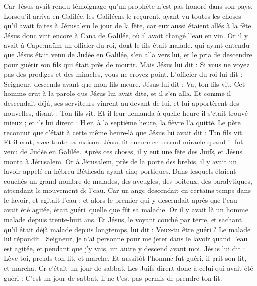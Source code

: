 \begin{multicols}{2}
Car Jésus avait rendu témoignage qu'un prophète n'est pas honoré dans son pays.
Lorsqu'il arriva en Galilée, les Galiléens le reçurent, ayant vu toutes les choses qu'il avait faites à Jérusalem le jour de la fête, car eux aussi étaient allés à la fête.
Jésus donc vint encore à Cana de Galilée, où il avait changé l'eau en vin. Or il y avait à Capernaüm un officier du roi, dont le fils était malade.
qui ayant entendu que Jésus était venu de Judée en Galilée, s'en alla vers lui, et le pria de descendre pour guérir son fils qui était près de mourir.
Mais Jésus lui dit : Si vous ne voyez pas des prodiges et des miracles, vous ne croyez point.
L'officier du roi lui dit : Seigneur, descends avant que mon fils meure.
Jésus lui dit : Va, ton fils vit. Cet homme crut à la parole que Jésus lui avait dite, et il s'en alla.
Et comme il descendait déjà, ses serviteurs vinrent au-devant de lui, et lui apportèrent des nouvelles, disant : Ton fils vit.
Et il leur demanda à quelle heure il s'était trouvé mieux ; et ils lui dirent : Hier, à la septième heure, la fièvre l'a quitté.
Le père reconnut que c'était à cette même heure-là que Jésus lui avait dit : Ton fils vit. Et il crut, avec toute sa maison.
Jésus fit encore ce second miracle quand il fut venu de Judée en Galilée.
\VerseOne{}Après ces choses, il y eut une fête des Juifs, et Jésus monta à Jérusalem.
Or à Jérusalem, près de la porte des brebis, il y avait un lavoir appelé en hébreu Béthesda ayant cinq portiques.
Dans lesquels étaient couchés un grand nombre de malades, des aveugles, des boiteux, des paralytiques, attendant le mouvement de l'eau.
Car un ange descendait en certains temps dans le lavoir, et agitait l'eau ; et alors le premier qui y descendait après que l'eau avait été agitée, était guéri, quelle que fût sa maladie.
Or il y avait là un homme malade depuis trente-huit ans.
Et Jésus, le voyant couché par terre, et sachant qu'il était déjà malade depuis longtemps, lui dit : Veux-tu être guéri ?
Le malade lui répondit : Seigneur, je n'ai personne pour me jeter dans le lavoir quand l'eau est agitée, et pendant que j'y vais, un autre y descend avant moi.
Jésus lui dit : Lève-toi, prends ton lit, et marche.
Et aussitôt l'homme fut guéri, il prit son lit, et marcha. Or c'était un jour de sabbat.
Les Juifs dirent donc à celui qui avait été guéri : C'est un jour de sabbat, il ne t'est pas permis de prendre ton lit.

\end{multicols}
